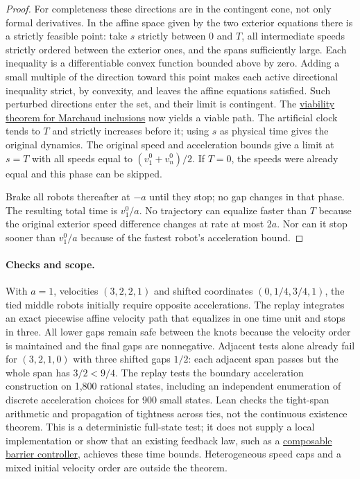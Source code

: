 \documentclass[11pt]{article}
\begin{document}
\begin{proof}
For completeness these directions are in the contingent cone, not only formal derivatives. In the affine space given by the two exterior equations there is a strictly feasible point: take $s$ strictly between $0$ and $T$, all intermediate speeds strictly ordered between the exterior ones, and the spans sufficiently large. Each inequality is a differentiable convex function bounded above by zero. Adding a small multiple of the direction toward this point makes each active directional inequality strict, by convexity, and leaves the affine equations satisfied. Such perturbed directions enter the set, and their limit is contingent. The \href{https://bayen.berkeley.edu/sites/default/files/siam08.pdf}{viability theorem for Marchaud inclusions} now yields a viable path. The artificial clock tends to $T$ and strictly increases before it; using $s$ as physical time gives the original dynamics. The original speed and acceleration bounds give a limit at $s=T$ with all speeds equal to $(v_1^0+v_n^0)/2$. If $T=0$, the speeds were already equal and this phase can be skipped.

Brake all robots thereafter at $-a$ until they stop; no gap changes in that phase. The resulting total time is $v_1^0/a$. No trajectory can equalize faster than $T$ because the original exterior speed difference changes at rate at most $2a$. Nor can it stop sooner than $v_1^0/a$ because of the fastest robot's acceleration bound.
\end{proof}

\paragraph{Checks and scope.}
With $a=1$, velocities $(3,2,2,1)$ and shifted coordinates $(0,1/4,3/4,1)$, the tied middle robots initially require opposite accelerations. The replay integrates an exact piecewise affine velocity path that equalizes in one time unit and stops in three. All lower gaps remain safe between the knots because the velocity order is maintained and the final gaps are nonnegative. Adjacent tests alone already fail for $(3,2,1,0)$ with three shifted gaps $1/2$: each adjacent span passes but the whole span has $3/2<9/4$. The replay tests the boundary acceleration construction on 1,800 rational states, including an independent enumeration of discrete acceleration choices for 900 small states. Lean checks the tight-span arithmetic and propagation of tightness across ties, not the continuous existence theorem. This is a deterministic full-state test; it does not supply a local implementation or show that an existing feedback law, such as a \href{https://liwanggt.github.io/files/B5_Composable_Barrier.pdf}{composable barrier controller}, achieves these time bounds. Heterogeneous speed caps and a mixed initial velocity order are outside the theorem.
\end{document}
